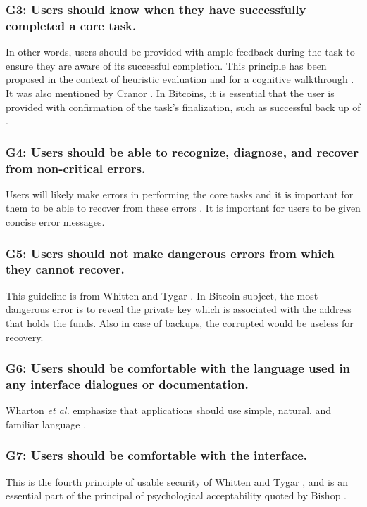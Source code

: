 \subsubsection*{G3: Users should know when they have successfully completed a core task.} In other words, users should be provided with ample feedback during the task to ensure they are aware of its successful completion. This principle has been proposed in the context of heuristic evaluation \cite{cw} and for a cognitive walkthrough \cite{pvo}. It was also mentioned by Cranor \cite{p3p}. In Bitcoins, it is essential that the user is provided with confirmation of the task's finalization, such as successful back up of \walletfile.

\subsubsection*{G4: Users should be able to recognize, diagnose, and recover from non-critical errors.} Users will likely make errors in performing the core tasks and it is important for them to be able to recover from these errors \cite{cw}. It is important for users to be given concise error messages.

\subsubsection*{G5: Users should not make dangerous errors from which they cannot recover.} This guideline is from Whitten and Tygar \cite{johnny}. In Bitcoin subject, the most dangerous error is to reveal the private key which is associated with the address that holds the funds. Also in case of backups, the corrupted \walletfile would be useless for recovery.

\subsubsection*{G6: Users should be comfortable with the language used in any interface dialogues or documentation.} Wharton \textit{et al.} emphasize that applications should use simple, natural, and familiar language \cite{cw}. 

\subsubsection*{G7: Users should be comfortable with the interface.} This is the fourth principle of usable security of Whitten and Tygar \cite{johnny}, and is an essential part of the principal of psychological acceptability quoted by Bishop \cite{pa}. 


